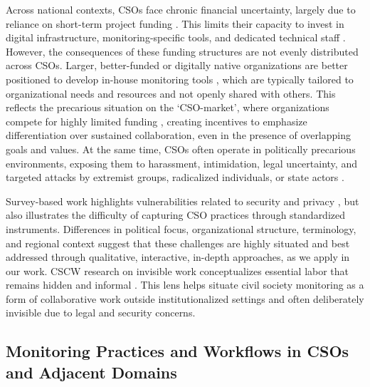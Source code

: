 \documentclass[acmsmall]{acmart}
\begin{document}
Across national contexts, CSOs face chronic financial uncertainty, largely due to reliance on short-term project funding \cite{hulshof-schmidt_2024_2024,noauthor_striving_2023,hummel_civil_2022}. This limits their capacity to invest in digital infrastructure, monitoring-specific tools, and dedicated technical staff \cite{hulshof-schmidt_2024_2024,hummel_civil_2022,noauthor_state_2025}. 
However, the consequences of these funding structures are not evenly distributed across CSOs. Larger, better-funded or digitally native organizations are better positioned to develop in-house monitoring tools \cite{isd_digital_2025,cemas_about_2025}, which are typically tailored to organizational needs and resources and not openly shared with others. This reflects the precarious situation on the `CSO-market', where organizations compete for highly limited funding \cite{hummel_civil_2022,noauthor_striving_2023,priemer_wie_2015}, creating incentives to emphasize differentiation over sustained collaboration, even in the presence of overlapping goals and values. 
At the same time, CSOs often operate in politically precarious environments, exposing them to harassment, intimidation, legal uncertainty, and targeted attacks by extremist groups, radicalized individuals, or state actors \cite{FRA2018,noauthor_protecting_2023,smidt_civil_2025}. 

Survey-based work highlights vulnerabilities related to security and privacy \cite{samarin_surveying_2020}, but also illustrates the difficulty of capturing CSO practices through standardized instruments. Differences in political focus, organizational structure, terminology, and regional context suggest that these challenges are highly situated and best addressed through qualitative, interactive, in-depth approaches, as we apply in our work. CSCW research on invisible work conceptualizes essential labor that remains hidden and informal \cite{star_layers_1999}. This lens helps situate civil society monitoring as a form of collaborative work outside institutionalized settings and often deliberately invisible due to legal and security concerns.

\subsection{Monitoring Practices and Workflows in CSOs and Adjacent Domains}
\label{ssec:practices_and_workflows}
\end{document}
